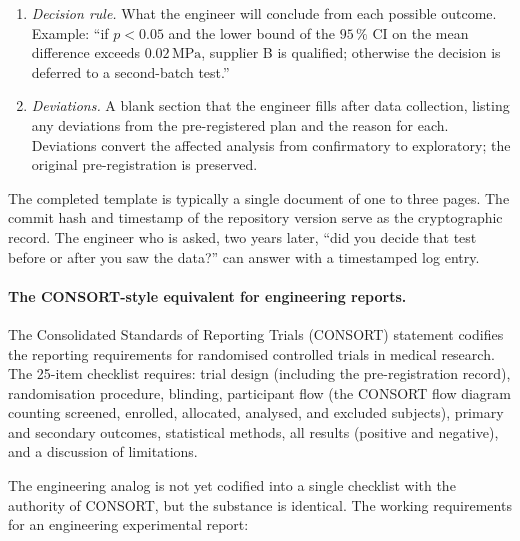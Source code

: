 \begin{enumerate}[leftmargin=*]
    $t$, two-sample Welch $t$, Mann-Whitney, ANOVA, etc.),
    the transformations applied to the raw measurements (none,
    log, Box-Cox), the covariates included as adjustment, and
    the post-hoc procedures if any (Tukey HSD, Bonferroni).
  \item \textit{Decision rule.} What the engineer will conclude
    from each possible outcome. Example: ``if $p < 0.05$ and
    the lower bound of the $95 \,\%$ CI on the mean difference
    exceeds $0.02\,\si{\mega\pascal}$, supplier B is qualified;
    otherwise the decision is deferred to a second-batch test.''
  \item \textit{Deviations.} A blank section that the engineer
    fills after data collection, listing any deviations from the
    pre-registered plan and the reason for each. Deviations
    convert the affected analysis from confirmatory to
    exploratory; the original pre-registration is preserved.
\end{enumerate}

The completed template is typically a single document of one to
three pages. The commit hash and timestamp of the repository
version serve as the cryptographic record. The engineer who is
asked, two years later, ``did you decide that test before or after
you saw the data?'' can answer with a timestamped log entry.

\paragraph{The CONSORT-style equivalent for engineering reports.}
The Consolidated Standards of Reporting Trials (CONSORT) statement
\cite{paper:ch08t3b-consort-2010} codifies the reporting
requirements for randomised controlled trials in medical research.
The 25-item checklist requires: trial design (including the
pre-registration record), randomisation procedure, blinding,
participant flow (the CONSORT flow diagram counting screened,
enrolled, allocated, analysed, and excluded subjects), primary
and secondary outcomes, statistical methods, all results
(positive and negative), and a discussion of limitations.

The engineering analog is not yet codified into a single
checklist with the authority of CONSORT, but the substance is
identical. The working requirements for an engineering
experimental report:

